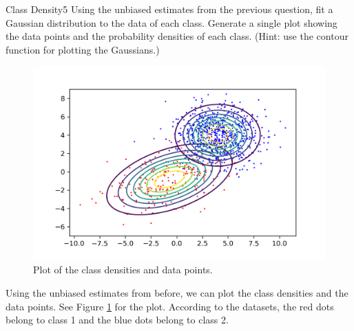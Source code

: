 \begin{questions}

\begin{question}{Class Density}{5}
Using the unbiased estimates from the previous question, fit a Gaussian distribution to the data of each class. Generate a single plot showing the data points and the probability densities of each class.
(Hint: use the contour function for plotting the Gaussians.) 
\begin{figure}[h!]
	\includegraphics[width=0.8\linewidth]{pictures/plot_gaussians.png}
	\centering
	\caption{Plot of the class densities and data points.}
	\label{fig:densities}
\end{figure}
\begin{answer}
Using the unbiased estimates from before, we can plot the class densities and the data points. See Figure \ref{fig:densities} for the plot. According to the datasets, the red dots belong to class 1 and the blue dots belong to class 2.
\end{answer}

\end{question}



\end{questions}
